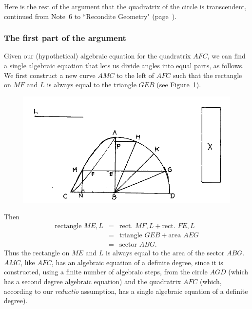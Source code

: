 \documentclass[twoside,openright]{article}
\begin{document}
Here is the rest of the argument that the quadratrix of the circle is
transcendent, continued from Note~6 to ``Recondite Geometry"
(page~\pageref{crg6}).

\subsubsection*{The first part of the argument}

Given our (hypothetical) algebraic equation for the quadratrix $AFC$,
we can find a single algebraic equation that lets us divide angles
into equal parts, as follows.  We first construct a new curve $AMC$ to
the left of $AFC$ such that the rectangle on $MF$ and $L$ is always
equal to the triangle $GEB$ (see Figure~\ref{circquad3}).
\begin{figure}[ht]
  \begin{center}
    \includegraphics[width=\textwidth]{fig/Figure32}
    \caption{}
    \label{circquad3}
    \vspace{-10pt}
  \end{center}
\end{figure}

Then
\begin{eqnarray*}
  \mbox{rectangle }ME,L & = & \mbox{rect.\ }MF,L + \mbox{rect.\ }FE,L\\
                        & = & \mbox{triangle }GEB + \mbox{area }AEG\\
                        & = & \mbox{sector }ABG.
\end{eqnarray*}
Thus the rectangle on $ME$ and $L$ is always equal to the area of the
sector $ABG$.  $AMC$, like $AFC$, has an algebraic equation of a
definite degree, since it is constructed, using a finite number of
algebraic steps, from the circle $AGD$ (which has a second degree
algebraic equation) and the quadratrix $AFC$ (which, according to our
{\em reductio} assumption, has a single algebraic equation of a
definite degree).
\end{document}
